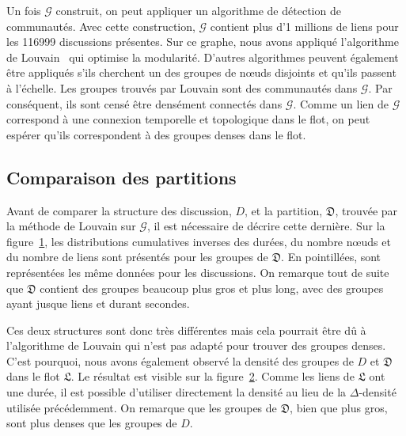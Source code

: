 Un fois $\mathcal{G}$ construit, on peut appliquer un algorithme de détection de communautés.
Avec cette construction, $\mathcal{G}$  contient plus d'1 millions de liens pour les 116999 discussions présentes.
Sur ce graphe, nous avons appliqué l'algorithme de Louvain~\cite{Blondel2008a} qui optimise la modularité.
D'autres algorithmes peuvent également être appliqués s'ils cherchent un des groupes de n\oe uds disjoints et qu'ils passent à l'échelle.
Les groupes trouvés par Louvain sont des communautés dans $\mathcal{G}$.
Par conséquent, ils sont censé être densément connectés dans $\mathcal{G}$.
Comme un lien de $\mathcal{G}$ correspond à une connexion temporelle et topologique dans le flot, on peut espérer qu'ils correspondent à des groupes denses dans le flot.

\subsection{Comparaison des partitions}

Avant de comparer la structure des discussion, $D$, et la partition, $\mathfrak{D}$, trouvée par la méthode de Louvain sur $\mathcal{G}$, il est nécessaire de décrire cette dernière.
Sur la figure~\ref{fig:carac_mail_louvain}, les distributions cumulatives inverses des durées, du nombre n\oe uds et du nombre de liens sont présentés pour les groupes de $\mathfrak{D}$.
En pointillées, sont représentées les même données pour les discussions.
On remarque tout de suite que $\mathfrak{D}$ contient des groupes beaucoup plus gros et plus long, avec des groupes ayant jusque  liens et durant  secondes.
\begin{figure}[]
\centering

\caption{}
\label{fig:carac_mail_louvain}
\end{figure}

Ces deux structures sont donc très différentes mais cela pourrait être dû à l'algorithme de Louvain qui n'est pas adapté pour trouver des groupes denses.
C'est pourquoi, nous avons également observé la densité des groupes de $D$ et $\mathfrak{D}$ dans le flot $\mathfrak{L}$.
Le résultat est visible sur la figure~\ref{fig:dens_mail_louvain}.
Comme les liens de $\mathfrak{L}$ ont une durée, il est possible d'utiliser directement la densité au lieu de la $\Delta$-densité utilisée précédemment.
On remarque que les groupes de $\mathfrak{D}$, bien que plus gros, sont plus denses que les groupes de $D$.

\begin{figure}[]
\centering

\caption{}
\label{fig:dens_mail_louvain}
\end{figure}

